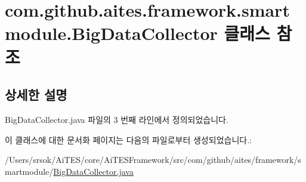 \hypertarget{classcom_1_1github_1_1aites_1_1framework_1_1smartmodule_1_1_big_data_collector}{}\section{com.\+github.\+aites.\+framework.\+smartmodule.\+Big\+Data\+Collector 클래스 참조}
\label{classcom_1_1github_1_1aites_1_1framework_1_1smartmodule_1_1_big_data_collector}


\subsection{상세한 설명}


Big\+Data\+Collector.\+java 파일의 3 번째 라인에서 정의되었습니다.



이 클래스에 대한 문서화 페이지는 다음의 파일로부터 생성되었습니다.\+:\begin{DoxyCompactItemize}
\item 
/\+Users/srsok/\+Ai\+T\+E\+S/core/\+Ai\+T\+E\+S\+Framework/src/com/github/aites/framework/smartmodule/\mbox{\hyperlink{_big_data_collector_8java}{Big\+Data\+Collector.\+java}}\end{DoxyCompactItemize}
